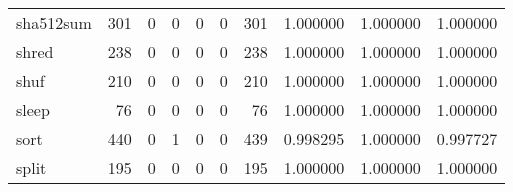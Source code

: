 \begin{longtable}{lrrrrrrrrr}
sha512sum &                                   301 &                                                  0 &                                                  0 &                                                  0 &                                                  0 &                                                301 &                                           1.000000 &                               1.000000 &                             1.000000 \\
shred     &                                   238 &                                                  0 &                                                  0 &                                                  0 &                                                  0 &                                                238 &                                           1.000000 &                               1.000000 &                             1.000000 \\
shuf      &                                   210 &                                                  0 &                                                  0 &                                                  0 &                                                  0 &                                                210 &                                           1.000000 &                               1.000000 &                             1.000000 \\
sleep     &                                    76 &                                                  0 &                                                  0 &                                                  0 &                                                  0 &                                                 76 &                                           1.000000 &                               1.000000 &                             1.000000 \\
sort      &                                   440 &                                                  0 &                                                  1 &                                                  0 &                                                  0 &                                                439 &                                           0.998295 &                               1.000000 &                             0.997727 \\
split     &                                   195 &                                                  0 &                                                  0 &                                                  0 &                                                  0 &                                                195 &                                           1.000000 &                               1.000000 &                             1.000000 \\

\end{longtable}
